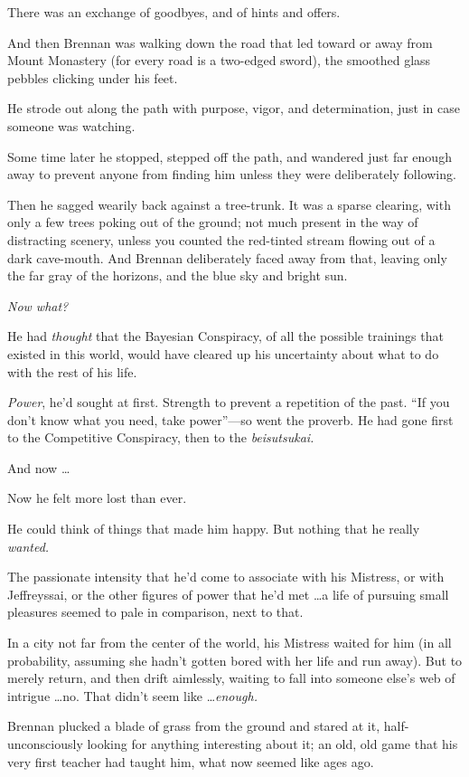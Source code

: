 {
 There was an exchange of goodbyes, and of hints and offers.}

{
 And then Brennan was walking down the road that led toward or away
from Mount Monastery (for every road is a two-edged sword), the
smoothed glass pebbles clicking under his feet.}

{
 He strode out along the path with purpose, vigor, and
determination, just in case someone was watching.}

{
 Some time later he stopped, stepped off the path, and wandered
just far enough away to prevent anyone from finding him unless they
were deliberately following.}

{
 Then he sagged wearily back against a tree-trunk. It was a sparse
clearing, with only a few trees poking out of the ground; not much
present in the way of distracting scenery, unless you counted the
red-tinted stream flowing out of a dark cave-mouth. And Brennan
deliberately faced away from that, leaving only the far gray of the
horizons, and the blue sky and bright sun.}

{
 \textit{Now what?}}

{
 He had \textit{thought} that the Bayesian Conspiracy, of all the
possible trainings that existed in this world, would have cleared up
his uncertainty about what to do with the rest of his life.}

{
 \textit{Power}, he'd sought at first. Strength to
prevent a repetition of the past. ``If you
don't know what you need, take
power''---so went the proverb. He had gone first to
the Competitive Conspiracy, then to the \textit{beisutsukai.}}

{
 And now \ldots}

{
 Now he felt more lost than ever.}

{
 He could think of things that made him happy. But nothing that he
really \textit{wanted.}}

{
 The passionate intensity that he'd come to
associate with his Mistress, or with Jeffreyssai, or the other figures
of power that he'd met \ldots a life of pursuing small
pleasures seemed to pale in comparison, next to that.}

{
 In a city not far from the center of the world, his Mistress
waited for him (in all probability, assuming she hadn't
gotten bored with her life and run away). But to merely return, and
then drift aimlessly, waiting to fall into someone
else's web of intrigue \ldots no. That
didn't seem like \ldots \textit{enough.}}

{
 Brennan plucked a blade of grass from the ground and stared at it,
half-unconsciously looking for anything interesting about it; an old,
old game that his very first teacher had taught him, what now seemed
like ages ago.}

